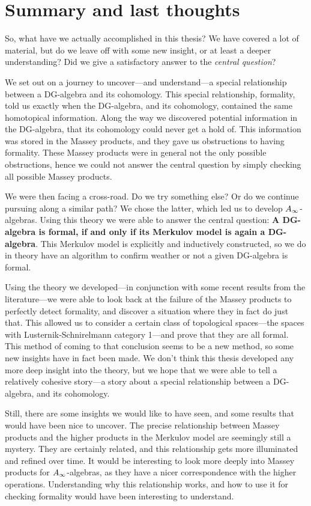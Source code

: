 \clearpage
\section{Summary and last thoughts}
\label{sec:summary}

So, what have we actually accomplished in this thesis? We have covered a lot of material, but do we leave off with some new insight, or at least a deeper understanding? Did we give a satisfactory answer to the \emph{central question}?

We set out on a journey to uncover---and understand---a special relationship between a DG-algebra and its cohomology. This special relationship, formality, told us exactly when the DG-algebra, and its cohomology, contained the same homotopical information. Along the way we discovered potential information in the DG-algebra, that its cohomology could never get a hold of. This information was stored in the Massey products, and they gave us obstructions to having formality. These Massey products were in general not the only possible obstructions, hence we could not answer the central question by simply checking all possible Massey products. 

We were then facing a cross-road. Do we try something else? Or do we continue pursuing along a similar path? We chose the latter, which led us to develop $A_{\infty}$-algebras. Using this theory we were able to answer the central question: \textbf{A DG-algebra is formal, if and only if its Merkulov model is again a DG-algebra}. This Merkulov model is explicitly and inductively constructed, so we do in theory have an algorithm to confirm weather or not a given DG-algebra is formal. 

Using the theory we developed---in conjunction with some recent results from the literature---we were able to look back at the failure of the Massey products to perfectly detect formality, and discover a situation where they in fact do just that. This allowed us to consider a certain class of topological spaces---the spaces with Lusternik-Schnirelmann category 1---and prove that they are all formal. This method of coming to that conclusion seems to be a new method, so some new insights have in fact been made. We don't think this thesis developed any more deep insight into the theory, but we hope that we were able to tell a relatively cohesive story---a story about a special relationship between a DG-algebra, and its cohomology. 

Still, there are some insights we would like to have seen, and some results that would have been nice to uncover. The precise relationship between Massey products and the higher products in the Merkulov model are seemingly still a mystery. They are certainly related, and this relationship gets more illuminated and refined over time. It would be interesting to look more deeply into Massey products for $A_{\infty}$-algebras, as they have a nicer correspondence with the higher operations. Understanding why this relationship works, and how to use it for checking formality would have been interesting to understand.

